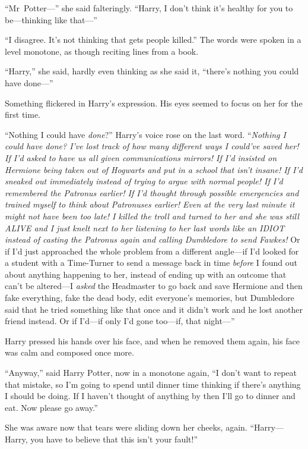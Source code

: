 “Mr~Potter—” she said falteringly.
“Harry, I don’t think it’s healthy for you to be—thinking like that—”

“I disagree. It’s not thinking that gets people killed.” The words were spoken in a level monotone, as though reciting lines from a book.

“Harry,” she said, hardly even thinking as she said it, “there’s nothing you could have done—”

Something flickered in Harry’s expression. His eyes seemed to focus on her for the first time.

“Nothing I could have \emph{done}?” Harry’s voice rose on the last word. “\emph{Nothing I could have \emph{done}? I’ve lost track of how many different ways I could’ve saved her! If I’d asked to have us all given communications mirrors! If I’d insisted on Hermione being taken out of Hogwarts and put in a school that isn’t insane! If I’d sneaked out immediately instead of trying to argue with normal people! If I’d remembered the Patronus earlier! If I’d thought through possible emergencies and trained myself to think about Patronuses earlier! Even at the very last minute it might not have been too late! I killed the troll and turned to her and she was still ALIVE and I just knelt next to her listening to her last words like an IDIOT instead of casting the Patronus again and calling Dumbledore to send Fawkes!} Or if I’d just approached the whole problem from a different angle—if I’d looked for a student with a Time-Turner to send a message back in time \emph{before} I found out about anything happening to her, instead of ending up with an outcome that can’t be altered—I \emph{asked} the Headmaster to go back and save Hermione and then fake everything, fake the dead body, edit everyone’s memories, but Dumbledore said that he tried something like that once and it didn’t work and he lost another friend instead. Or if I’d—if only I’d gone too—if, that night—”

Harry pressed his hands over his face, and when he removed them again, his face was calm and composed once more.

“Anyway,” said Harry Potter, now in a monotone again,
“I don’t want to repeat that mistake, so I’m going to spend until dinner time thinking if there’s anything I should be doing. If I haven’t thought of anything by then I’ll go to dinner and eat. Now please go away.”

She was aware now that tears were sliding down her cheeks, again.
“Harry—Harry, you have to believe that this isn’t your fault!”

